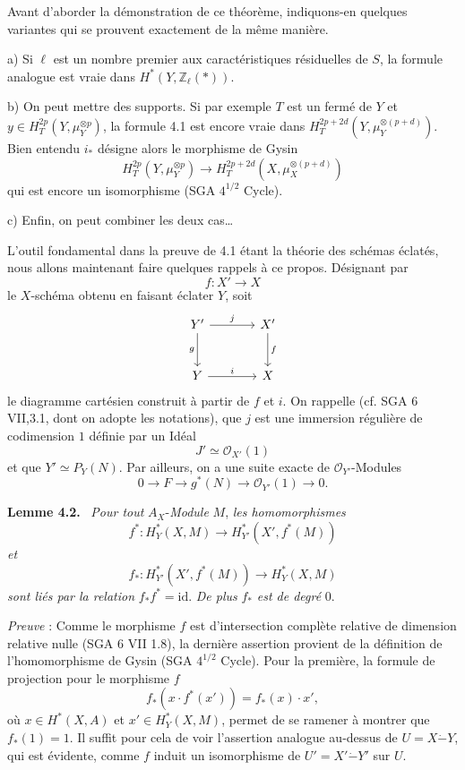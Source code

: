 \documentclass[11pt]{article}
\newenvironment{statement}[1]{\par\medskip\noindent\textbf{#1.}\ }{\par\medskip}
\begin{document}
Avant d'aborder la démonstration de ce théorème, indiquons-en quelques variantes qui se prouvent exactement de la même manière.

a) Si $\ell$ est un nombre premier aux caractéristiques résiduelles de $S$, la formule analogue est vraie dans $H^*(Y,\mathbb Z_\ell(*))$.

b) On peut mettre des supports. Si par exemple $T$ est un fermé de $Y$ et $y\in H_T^{2p}(Y,\mu_Y^{\otimes p})$, la formule 4.1 est encore vraie dans $H_T^{2p+2d}(Y,\mu_Y^{\otimes(p+d)})$. Bien entendu $i_*$ désigne alors le morphisme de Gysin
\[
H_T^{2p}(Y,\mu_Y^{\otimes p})
\to H_T^{2p+2d}(X,\mu_X^{\otimes(p+d)})
\]
qui est
encore un isomorphisme (SGA $4^{1/2}$ Cycle).

c) Enfin, on peut combiner les deux cas\dots

L'outil fondamental dans la preuve de 4.1 étant la théorie des schémas éclatés, nous allons maintenant faire quelques rappels à ce propos. Désignant par
\[
f:X'\to X
\]
le $X$-schéma obtenu en faisant éclater $Y$, soit
\[
\begin{tikzcd}[column sep=large,row sep=large]
Y' \arrow[r,"j"] \arrow[d,"g"'] & X' \arrow[d,"f"]\\
Y \arrow[r,"i"] & X
\end{tikzcd}
\]
le diagramme cartésien construit à partir de $f$ et $i$. On rappelle (cf. SGA 6 VII,3.1, dont on adopte les notations), que $j$ est une immersion régulière de codimension $1$ définie par un Idéal
\[
J'\simeq\mathcal O_{X'}(1)
\]
et que $Y'\simeq P_Y(N)$. Par ailleurs, on a une suite exacte de $\mathcal O_{Y'}$-Modules
\[
0\to F\to g^*(N)\to \mathcal O_{Y'}(1)\to0.
\]

\begin{statement}{Lemme 4.2}
\emph{Pour tout} $A_X$-\emph{Module} $M$, \emph{les homomorphismes}
\[
f^*:H_Y^*(X,M)\to H_{Y'}^*(X',f^*(M))
\]
\emph{et}
\[
f_*:H_{Y'}^*(X',f^*(M))\to H_Y^*(X,M)
\]
\emph{sont liés par la relation} $f_*f^*=\mathrm{id}$. \emph{De plus} $f_*$ \emph{est de degré} $0$.
\end{statement}

\emph{Preuve} : Comme le morphisme $f$ est d'intersection complète relative de dimension relative nulle (SGA 6 VII 1.8), la dernière assertion provient de la définition de l'homomorphisme de Gysin (SGA $4^{1/2}$ Cycle). Pour la première, la formule de projection pour le morphisme $f$
\[
f_*(x\cdot f^*(x'))=f_*(x)\cdot x',
\]
où $x\in H^*(X,A)$ et $x'\in H_Y^*(X,M)$,
permet de se ramener à montrer que $f_*(1)=1$. Il suffit pour cela de voir l'assertion analogue au-dessus de $U=X\mathbin{\dot{-}}Y$, qui est évidente, comme $f$ induit un isomorphisme de $U'=X'\mathbin{\dot{-}}Y'$ sur $U$.
\end{document}
